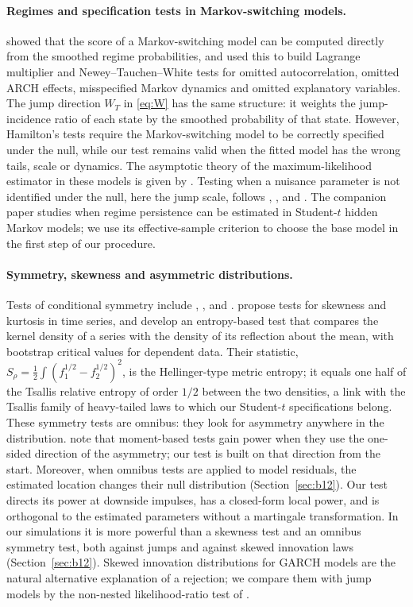\documentclass[11pt,a4paper]{article}
\theoremstyle{definition}
\theoremstyle{remark}
\begin{document}
\paragraph{Regimes and specification tests in Markov-switching models.} \citet{hamilton1996} showed that the score of a Markov-switching model can be computed directly from the smoothed regime probabilities, and used this to build Lagrange multiplier and Newey--Tauchen--White tests for omitted autocorrelation, omitted ARCH effects, misspecified Markov dynamics and omitted explanatory variables. The jump direction $W_T$ in \eqref{eq:W} has the same structure: it weights the jump-incidence ratio of each state by the smoothed probability of that state. However, Hamilton's tests require the Markov-switching model to be correctly specified under the null, while our test remains valid when the fitted model has the wrong tails, scale or dynamics. The asymptotic theory of the maximum-likelihood estimator in these models is given by \citet{douc2004}. Testing when a nuisance parameter is not identified under the null, here the jump scale, follows \citet{davies1977,davies1987}, \citet{andrews1994ap}, \citet{hansen1992} and \citet{hansen1996}. The companion paper \citet{giornoA} studies when regime persistence can be estimated in Student-$t$ hidden Markov models; we use its effective-sample criterion to choose the base model in the first step of our procedure.

\paragraph{Symmetry, skewness and asymmetric distributions.} Tests of conditional symmetry include \citet{bainh2001}, \citet{su2006}, \citet{fernandes2015} and \citet{chen2024cs}. \citet{bainh2005} propose tests for skewness and kurtosis in time series, and \citet{maasoumi2009} develop an entropy-based test that compares the kernel density of a series with the density of its reflection about the mean, with bootstrap critical values for dependent data. Their statistic, $S_\rho=\tfrac12\int(f_1^{1/2}-f_2^{1/2})^2$, is the Hellinger-type metric entropy; it equals one half of the Tsallis relative entropy of order $1/2$ between the two densities, a link with the Tsallis family of heavy-tailed laws to which our Student-$t$ specifications belong. These symmetry tests are omnibus: they look for asymmetry anywhere in the distribution. \citet{maasoumi2009} note that moment-based tests gain power when they use the one-sided direction of the asymmetry; our test is built on that direction from the start. Moreover, when omnibus tests are applied to model residuals, the estimated location changes their null distribution (Section~\ref{sec:b12}). Our test directs its power at downside impulses, has a closed-form local power, and is orthogonal to the estimated parameters without a martingale transformation. In our simulations it is more powerful than a skewness test and an omnibus symmetry test, both against jumps and against skewed innovation laws (Section~\ref{sec:b12}). Skewed innovation distributions for GARCH models \citep{hansen1994,fernandez1998,trottier2016} are the natural alternative explanation of a rejection; we compare them with jump models by the non-nested likelihood-ratio test of \citet{vuong1989}.
\end{document}
